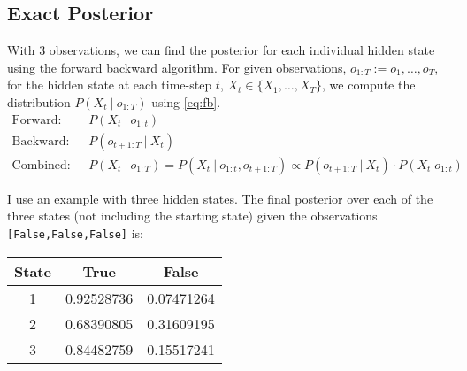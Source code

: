 \subsection{Exact Posterior}
With 3 observations, we can find the posterior for each individual hidden state using the forward backward algorithm. 
For given observations, $o_{1:T}:=o_{1},\dots ,o_{T}$, for the hidden state at each time-step $t$, $X_{t}\in \{X_{1},\dots ,X_{T}\}$, we compute the distribution $P(X_{t}\ |\ o_{1:T})$ using \eqref{eq:fb}.
% 
\begin{align}
	\text{Forward:~~}  & P(X_{t}\ |\ o_{1:t})                                                                                    \nonumber     \\
	\text{Backward:~~} & P(o_{t+1:T}\ |\ X_{t})                                                                                 \nonumber      \\
	\text{Combined:~~} & P(X_{t}\ |\ o_{1:T})=P(X_{t}\ |\ o_{1:t},o_{t+1:T})\propto P(o_{t+1:T}\ |\ X_{t})\cdot P(X_{t}|o_{1:t}) \label{eq:fb} 
\end{align}

I use an example with three hidden states. The final posterior over each of the three states (not including the starting state) given the observations \texttt{[False,False,False]} is:

\begin{table}[!h]
	\centering
	\begin{tabular}{c|c|c}
		State & True       & False      \\\hline
		1     & 0.92528736 & 0.07471264 \\
		2     & 0.68390805 & 0.31609195 \\
		3     & 0.84482759 & 0.15517241 \\
	\end{tabular}
\end{table}
	

	
	

